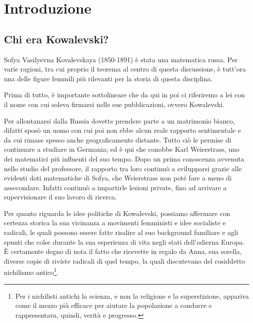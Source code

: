 \chapter{Introduzione}

\section{Chi era Kowalevski?}

Sofya Vasilyevna Kovalevskaya (1850-1891) è stata una matematica russa. Per varie ragioni, tra cui proprio il teorema al centro di questa discussione, è tutt’ora una delle figure femmili più rilevanti per la storia di questa disciplina.

Prima di tutto, è importante sottolineare che da qui in poi ci riferiremo a lei con il nome con cui soleva firmarsi nelle sue pubblicazioni, ovvero Kowalevski.

Per allontanarsi dalla Russia dovette prendere parte a un matrimonio bianco, difatti sposò un uomo con cui poi non ebbe alcun reale rapporto sentimentale e da cui rimase spesso anche geograficamente distante.
Tutto ciò le permise di continuare a studiare in Germania; ed è qui che conobbe Karl Weierstrass, uno dei matematici più influenti del suo tempo.
Dopo un prima conoscenza avvenuta nello studio del professore, il rapporto tra loro continuò a svilupparsi grazie alle evidenti doti matematiche di Sofya, che Weierstrass non poté fare a meno di assecondare. Infatti continuò a impartirle lezioni private, fino ad arrivare a supervisionare il suo lavoro di ricerca.

Per quanto riguarda le idee politiche di Kowalevski, possiamo affermare con certezza storica la sua vicinanza a movimenti femministi e idee socialiste e radicali, le quali possono essere fatte risalire al suo background familiare e agli spunti che colse durante la sua esperienza di vita negli stati dell'odierna Europa. È certamente degno di nota il fatto che ricevette in regalo da Anna, sua sorella, diverse copie di riviste radicali di quel tempo, la quali discutevano del cosiddetto nichilismo antico\footnote{Per i nichilisti antichi la scienza, e non la religione e la superstizione, appariva come il mezzo più efficace per aiutare la popolazione a condurre e rappresentava, quindi, verità e progresso.}.

